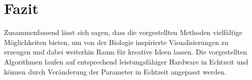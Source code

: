 \section{Fazit}
Zusammenfassend lässt sich sagen, dass die vorgestellten Methoden vielfältige Möglichkeiten bieten, um von der Biologie inspirierte Visualisierungen zu erzeugen und dabei weiterhin Raum für kreative Ideen lassen.
Die vorgestellten Algorithmen laufen auf entsprechend leistungsfähiger Hardware in Echtzeit und können durch Veränderung der Parameter in Echtzeit angepasst werden.